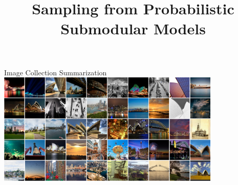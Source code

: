 \documentclass[mathserif]{beamer}
\title[Sampling from Probabilistic Submodular Models]
{Sampling from Probabilistic Submodular Models}
\author[Alkis Gotovos]{}
\begin{document}


\begin{frame}{Image Collection Summarization}
\vspace{0.5em}
\centering
\includegraphics[width=4.2in]{figures/flickr_probs_0.png}
\end{frame}
\end{document}
